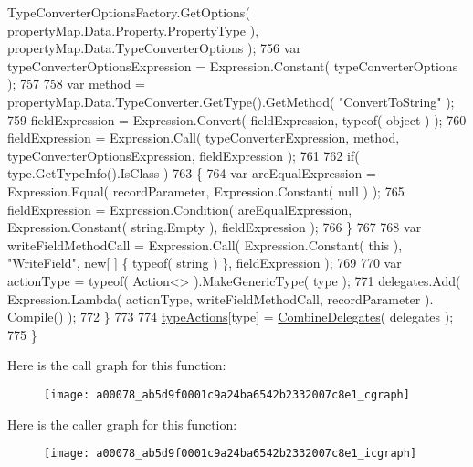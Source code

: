 \begin{DoxyCode}
      TypeConverterOptionsFactory.GetOptions( propertyMap.Data.Property.PropertyType ), propertyMap.Data.TypeConverterOptions );
756                 var typeConverterOptionsExpression = Expression.Constant( typeConverterOptions );
757 
758                 var method = propertyMap.Data.TypeConverter.GetType().GetMethod( \textcolor{stringliteral}{"ConvertToString"} );
759                 fieldExpression = Expression.Convert( fieldExpression, typeof( \textcolor{keywordtype}{object} ) );
760                 fieldExpression = Expression.Call( typeConverterExpression, method, 
      typeConverterOptionsExpression, fieldExpression );
761 
762                 \textcolor{keywordflow}{if}( type.GetTypeInfo().IsClass )
763                 \{
764                     var areEqualExpression = Expression.Equal( recordParameter, Expression.Constant( null )
       );
765                     fieldExpression = Expression.Condition( areEqualExpression, Expression.Constant( 
      string.Empty ), fieldExpression );
766                 \}
767 
768                 var writeFieldMethodCall = Expression.Call( Expression.Constant( this ), \textcolor{stringliteral}{"WriteField"}, \textcolor{keyword}{new}[
      ] \{ typeof( \textcolor{keywordtype}{string} ) \}, fieldExpression );
769 
770                 var actionType = typeof( Action<> ).MakeGenericType( type );
771                 delegates.Add( Expression.Lambda( actionType, writeFieldMethodCall, recordParameter ).
      Compile() );
772             \}
773 
774             \hyperlink{a00078_a93af56d83ee3a76d1d3ce39f9c344d15}{typeActions}[type] = \hyperlink{a00078_ab6cbf58f5e59e5d6091a89e4e778f11b}{CombineDelegates}( delegates );
775         \}
\end{DoxyCode}


Here is the call graph for this function\-:
\nopagebreak
\begin{figure}[H]
\begin{center}
\leavevmode
\texttt{[image: a00078\_ab5d9f0001c9a24ba6542b2332007c8e1\_cgraph]}
\end{center}
\end{figure}




Here is the caller graph for this function\-:
\nopagebreak
\begin{figure}[H]
\begin{center}
\leavevmode
\texttt{[image: a00078\_ab5d9f0001c9a24ba6542b2332007c8e1\_icgraph]}
\end{center}
\end{figure}


